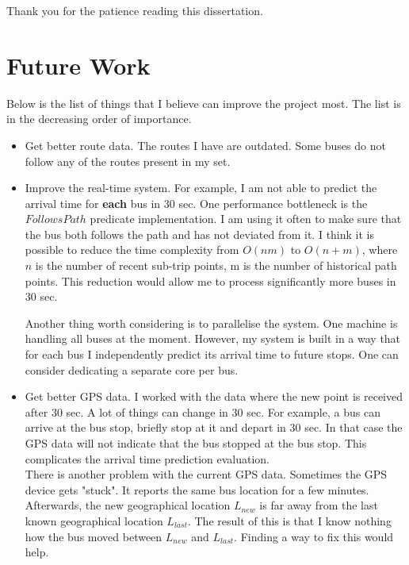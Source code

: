 \documentclass[12pt,a4paper,oneside,openright]{report}
\begin{document}
Thank you for the patience reading this dissertation.

\section{Future Work}

Below is the list of things that I believe can improve the project most. The list is in the
decreasing order of importance.

\begin{itemize}

\item  Get better route data. The routes I have are outdated. Some buses do not follow any
       of the routes present in my set.

\item  Improve the real-time system. For example, I am not able to
       predict the arrival time for \textbf{each} bus in 30 sec. 
       One performance bottleneck is the $FollowsPath$ predicate implementation.
       I am using it often to make sure that the bus both follows the path and has not deviated
       from it. I think it is possible to reduce the time complexity from $O(nm)$ to $O(n + m)$,
       where $n$ is the number of recent sub-trip points, m is the number of historical path points.
       This reduction would allow me to process significantly more buses in 30 sec.

       Another thing worth considering is to parallelise the system. One machine is handling all buses
       at the moment. However, my system is built in
       a way that for each bus I independently predict its arrival time to future stops.
       One can consider dedicating a separate core per bus.

\item  Get better GPS data. I worked with the data where the new point is received after
       30 sec. A lot of things can change in 30 sec. For example, a bus can arrive at the bus
       stop, briefly stop at it and depart in 30 sec. In that case the GPS data will not
       indicate that the bus stopped at the bus stop. This complicates the arrival time
       prediction evaluation. \\

       There is another problem with the current GPS data. Sometimes the GPS device gets
       "stuck". It reports the same bus location for a few minutes. Afterwards, the new geographical
       location $L_{new}$ is far away from the last known geographical location $L_{last}$.
       The result of this is that I know nothing how the bus moved between $L_{new}$ and $L_{last}$.
       Finding a way to fix this would help.


\end{itemize}
\end{document}
